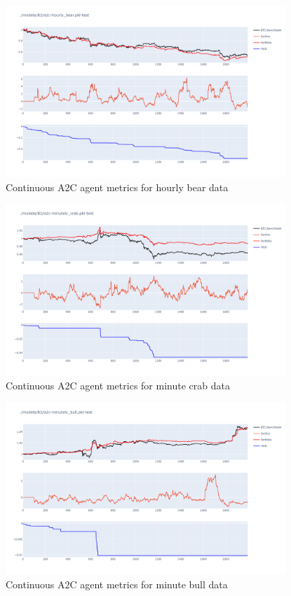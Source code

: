 \begin{figure}[H]
    \centering
    \includegraphics[width=0.94\textwidth]{graphics/testphoto/a2c-cont-hbr.png}
    \caption{Continuous A2C agent metrics for hourly bear data}
    \label{f-a2c-cont-hbr}
\end{figure}

\begin{figure}[H]
    \centering
    \includegraphics[width=0.94\textwidth]{graphics/testphoto/a2c-cont-mcr.png}
    \caption{Continuous A2C agent metrics for minute crab data}
    \label{f-a2c-cont-mcr}
\end{figure}

\begin{figure}[H]
    \centering
    \includegraphics[width=0.94\textwidth]{graphics/testphoto/a2c-cont-mbu.png}
    \caption{Continuous A2C agent metrics for minute bull data}
    \label{f-a2c-cont-mbu}
\end{figure}

